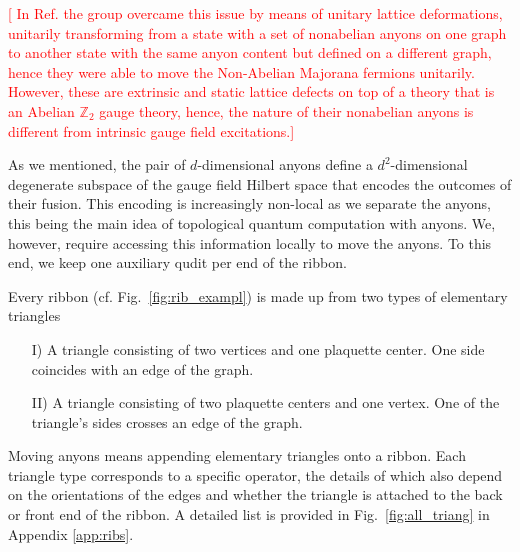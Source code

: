 \documentclass[two column]{article}
\newcommand{\caro}[1]{\textcolor{red}{[#1]}}
\begin{document}
\caro{%
In Ref. \cite{andersen2022observation} the group overcame this issue by means of unitary lattice deformations, unitarily transforming from a state with a set of nonabelian anyons on one graph to another state with the same anyon content but defined on a different graph, hence they were able to move the Non-Abelian Majorana fermions unitarily. However, these are extrinsic and static lattice defects on top of a theory that is an Abelian $\mathbb Z_2$ gauge theory, hence, the nature of their nonabelian anyons is different from intrinsic gauge field excitations.}




As we mentioned, the pair of $d$-dimensional anyons define a $d^2$-dimensional degenerate subspace of the gauge field Hilbert space that encodes the outcomes of their fusion. This encoding is increasingly non-local as we separate the anyons, this being the main idea of topological quantum computation with anyons. We, however, require accessing this information locally to move the anyons. To this end, we keep one auxiliary qudit per end of the ribbon.

Every ribbon (cf. Fig.~\ref{fig:rib_exampl}) is made up from two types of elementary triangles
\begin{itemize}
    \item[I)] A triangle consisting of two vertices and one plaquette center. One side coincides with an edge of the graph.
        \item[II)] A triangle consisting of two plaquette centers and one vertex. One of the triangle's sides crosses an edge of the graph.
\end{itemize}
Moving anyons means appending elementary triangles onto a ribbon. Each triangle type corresponds to a specific operator, the details of which also depend on the orientations of the edges and whether the triangle is attached to the back or front end of the ribbon. A detailed list is provided in Fig.~\ref{fig:all_triang} in Appendix \ref{app:ribs}.
\end{document}
